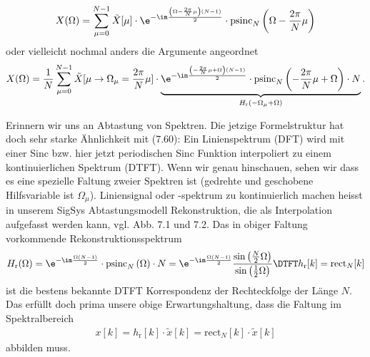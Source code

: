 \begin{ExCalc}
%
\begin{equation}
\label{eq:6337B75DF2_DFT2DTFT}
X(\Omega)=\sum_{\mu=0}^{N-1}\tilde{X}[\mu]\cdot\e^{-\im\frac{\left(\Omega-\frac{2\pi}{N}\mu\right)(N-1)}{2}}\cdot\text{psinc}_N\left(\Omega-\frac{2\pi}{N}\mu\right)
\end{equation}
oder vielleicht nochmal anders die Argumente angeordnet
\begin{equation}
X(\Omega)=\frac{1}{N}\sum_{\mu=0}^{N-1}\tilde{X}[\mu\rightarrow \Omega_\mu = \frac{2\pi}{N} \mu]\cdot
\underbrace{\e^{-\im\frac{\left(-\frac{2\pi}{N}\mu+\Omega\right)(N-1)}{2}}\cdot\text{psinc}_N\left(-\frac{2\pi}{N}\mu + \Omega\right)\cdot N}_{H_\mathrm{r}\left(-\Omega_\mu+\Omega\right)}.
\end{equation}

Erinnern wir uns an Abtastung von Spektren. Die
jetzige Formelstruktur hat doch sehr starke Ähnlichkeit mit (7.60):
Ein Linienspektrum (DFT) wird mit einer Sinc bzw. hier jetzt periodischen
Sinc Funktion interpoliert zu einem kontinuierlichen Spektrum (DTFT).
Wenn wir genau hinschauen, sehen wir dass es eine spezielle Faltung zweier
Spektren ist (gedrehte und geschobene Hilfsvariable ist $\Omega_\mu$).
%
Liniensignal oder -spektrum zu kontinuierlich machen heisst in unserem
SigSys Abtastungsmodell Rekonstruktion, die als Interpolation
aufgefasst werden kann, vgl. Abb. 7.1 und 7.2.
Das in obiger Faltung vorkommende Rekonstruktionsspektrum
\begin{align}
H_\mathrm{r}(\Omega) =
\e^{-\im\frac{\Omega(N-1)}{2}}\cdot\text{psinc}_N\left(\Omega\right)\cdot N =
\e^{-\im\frac{\Omega(N-1)}{2}}
\frac{\sin\left(\frac{N}{2}\Omega\right)}{\sin\left(\frac{1}{2}\Omega\right)}
\DTFT
h_\mathrm{r}[k] = \mathrm{rect}_N[k]
\end{align}
ist die bestens bekannte DTFT Korrespondenz der Rechteckfolge der Länge $N$.
Das erfüllt doch prima unsere obige Erwartungshaltung, dass die Faltung
im Spektralbereich
\begin{align}
x[k] = h_\mathrm{r}[k]  \cdot \tilde{x}[k] = \mathrm{rect}_N[k] \cdot \tilde{x}[k]
\end{align}
abbilden muss.

\end{ExCalc}
